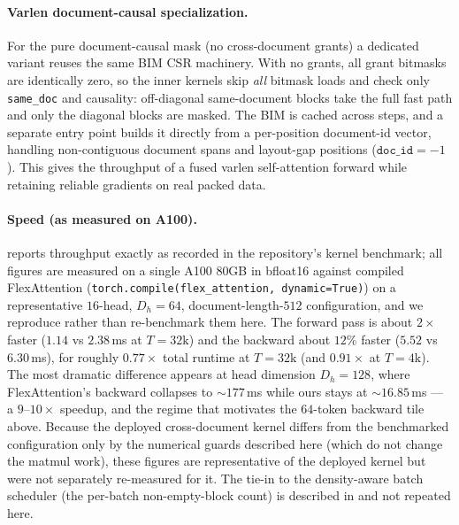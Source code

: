 \paragraph{Varlen document-causal specialization.}\label{par:varlen}
For the pure document-causal mask (no cross-document grants) a dedicated variant reuses
the same BIM CSR machinery. With no grants, all grant bitmasks are identically zero, so
the inner kernels skip \emph{all} bitmask loads and check only \texttt{same\_doc} and
causality: off-diagonal same-document blocks take the full fast path and only the
diagonal blocks are masked. The BIM is cached across steps, and a separate entry point
builds it directly from a per-position document-id vector, handling non-contiguous
document spans and layout-gap positions ($\texttt{doc\_id}=-1$). This gives the
throughput of a fused varlen self-attention forward while retaining reliable gradients
on real packed data.

\paragraph{Speed (as measured on A100).}
 reports throughput exactly as recorded in the repository's
kernel benchmark; all figures are measured on a single A100 80GB in bfloat16 against
compiled FlexAttention (\texttt{torch.compile(flex\_attention, dynamic=True)}) on a
representative $16$-head, $D_h=64$, document-length-$512$ configuration, and we
reproduce rather than re-benchmark them here. The forward pass is about $2\times$
faster ($1.14$ vs $2.38$\,ms at $T=32\text{k}$) and the backward about $12\%$ faster
($5.52$ vs $6.30$\,ms), for roughly $0.77\times$ total runtime at $T=32\text{k}$ (and
$0.91\times$ at $T=4\text{k}$). The most dramatic difference appears at head dimension
$D_h=128$, where FlexAttention's backward collapses to $\sim 177$\,ms while ours stays
at $\sim 16.85$\,ms --- a $9$--$10\times$ speedup, and the regime that motivates the
$64$-token backward tile above. Because the deployed cross-document kernel differs from
the benchmarked configuration only by the numerical guards described here (which do not
change the matmul work), these figures are representative of the deployed kernel but
were not separately re-measured for it. The tie-in to the density-aware batch scheduler
(the per-batch non-empty-block count) is described in  and not
repeated here.

